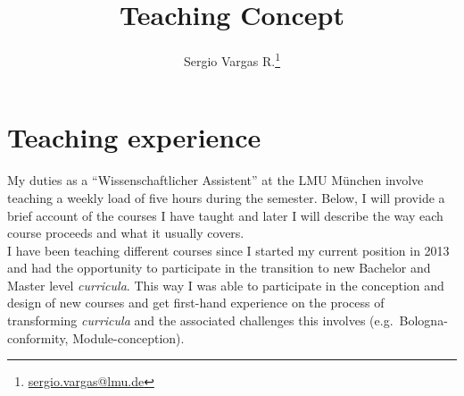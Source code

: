 \documentclass[a4paper,11pt]{article}
\makeatletter
\renewcommand{\maketitle}{\bgroup\setlength{\parindent}{0pt}
\begin{flushleft}
  \thispagestyle{plain}
  \textbf{\@title}

  \@author
\end{flushleft}\egroup
}
\renewenvironment{abstract}
 {\small
  \begin{flushleft}
  \textbf{\abstractname}\vspace{-0.40em}\vspace{0pt}
  \end{flushleft}
  \list{}{
    \setlength{\leftmargin}{0cm}%
    \setlength{\rightmargin}{\leftmargin}%
  }%
  \item\relax}
 {\endlist}
\makeatother
\begin{document}
\title{\Large Teaching Concept\newline}

\author[1]{Sergio Vargas R.\footnote[2]{\href{sergio.vargas@lmu.de}{sergio.vargas@lmu.de}}}


\date{}

\maketitle


\section*{Teaching experience}

My duties as a ``Wissenschaftlicher Assistent'' at the LMU M\"unchen involve teaching a weekly load of five hours during the semester. Below, I will provide a brief account of the courses I have taught and later I will describe the way each course proceeds and what it usually covers.\\

I have been teaching different courses since I started my current position in 2013 and had the opportunity to participate in the transition to new Bachelor and Master level \emph{curricula}. This way I was able to participate in the conception and design of new courses and get first-hand experience on the process of transforming \emph{curricula} and the associated challenges this involves (e.g.~Bologna-conformity, Module-conception).\\
\end{document}
